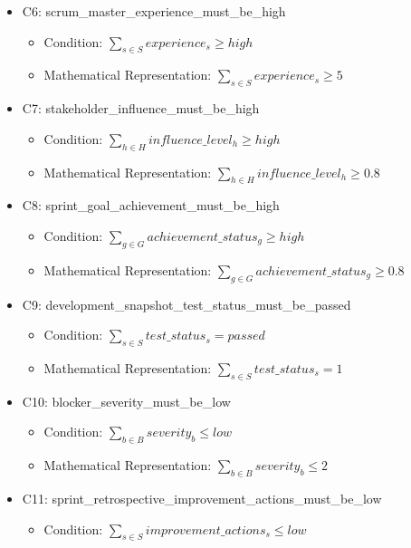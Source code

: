 \documentclass{article}
\begin{document}
\begin{itemize}
\begin{itemize}
        \end{itemize}
    \item C6: scrum\_master\_experience\_must\_be\_high
        \begin{itemize}
            \item Condition: $\sum_{s \in S} experience_s \geq high$
            \item Mathematical Representation: $\sum_{s \in S} experience_s \geq 5$
        \end{itemize}
    \item C7: stakeholder\_influence\_must\_be\_high
        \begin{itemize}
            \item Condition: $\sum_{h \in H} influence\_level_h \geq high$
            \item Mathematical Representation: $\sum_{h \in H} influence\_level_h \geq 0.8$
        \end{itemize}
    \item C8: sprint\_goal\_achievement\_must\_be\_high
        \begin{itemize}
            \item Condition: $\sum_{g \in G} achievement\_status_g \geq high$
            \item Mathematical Representation: $\sum_{g \in G} achievement\_status_g \geq 0.8$
        \end{itemize}
    \item C9: development\_snapshot\_test\_status\_must\_be\_passed
        \begin{itemize}
            \item Condition: $\sum_{s \in S} test\_status_s = passed$
            \item Mathematical Representation: $\sum_{s \in S} test\_status_s = 1$
        \end{itemize}
    \item C10: blocker\_severity\_must\_be\_low
        \begin{itemize}
            \item Condition: $\sum_{b \in B} severity_b \leq low$
            \item Mathematical Representation: $\sum_{b \in B} severity_b \leq 2$
        \end{itemize}
    \item C11: sprint\_retrospective\_improvement\_actions\_must\_be\_low
        \begin{itemize}
            \item Condition: $\sum_{s \in S} improvement\_actions_s \leq low$

\end{itemize}
\end{itemize}
\end{document}
